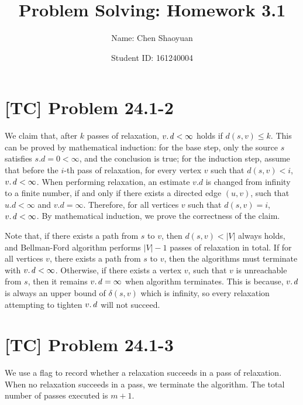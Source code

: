 \documentclass[a4paper,11pt,twocolumn]{article}
\newcommand{\homeworkno}{3.1}
\begin{document}
  \title{Problem Solving: Homework \homeworkno}
  \author{Name: Chen Shaoyuan \and Student ID: 161240004}
  \maketitle

  \section{[TC] Problem 24.1-2}
  We claim that, after $k$ passes of relaxation, $\attrib{v}{d} < \infty$ holds if $d(s, v) \leq k$. This can be proved by mathematical induction: for the base step, only the source $s$ satisfies $s.d = 0 < \infty$, and the conclusion is true; for the induction step, assume that before the $i$-th pass of relaxation, for every vertex $v$ such that $d(s, v) < i$,  $\attrib{v}{d} < \infty$. When performing relaxation, an estimate $v.d$ is changed from infinity to a finite number, if and only if there exists a directed edge $(u, v)$, such that $u.d < \infty$ and $v.d = \infty$. Therefore, for all vertices $v$ such that $d(s, v) = i$, $\attrib{v}{d} < \infty$. By mathematical induction, we prove the correctness of the claim. \par
  Note that, if there exists a path from $s$ to $v$, then $d(s, v) < |V|$ always holds, and Bellman-Ford algorithm performs $|V|-1$ passes of relaxation in total. If for all vertices $v$, there exists a path from $s$ to $v$, then the algorithms must terminate with $\attrib{v}{d} < \infty$. Otherwise, if there exists a vertex $v$, such that $v$ is unreachable from $s$, then it remains $\attrib{v}{d} = \infty$ when algorithm terminates. This is because, $\attrib{v}{d}$ is always an upper bound of $\delta(s, v)$ which is infinity, so every relaxation attempting to tighten $\attrib{v}{d}$ will not succeed.
  
  \section{[TC] Problem 24.1-3}
  We use a flag to record whether a relaxation succeeds in a pass of relaxation. When no relaxation succeeds in a pass, we terminate the algorithm. The total number of passes executed is $m+1$.
  
\end{document}
